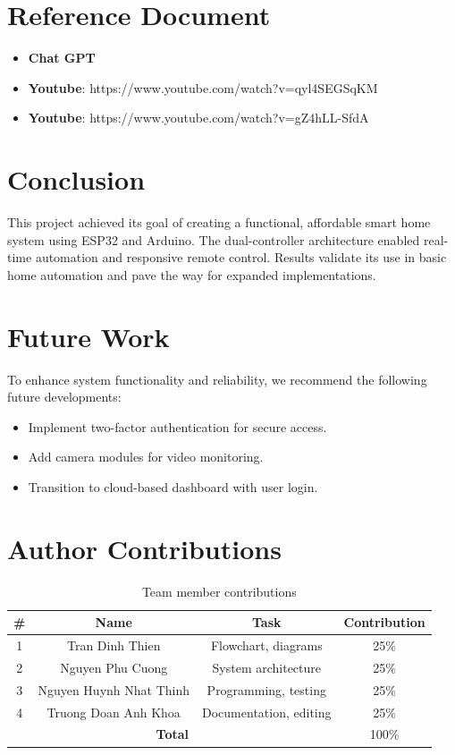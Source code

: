 \documentclass[conference, onecolumn]{IEEEtran}
\begin{document}
\section{Reference Document}
\begin{itemize}
    \item \textbf{Chat GPT}
    \item \textbf{Youtube}: https://www.youtube.com/watch?v=qyl4SEGSqKM
    \item \textbf{Youtube}: https://www.youtube.com/watch?v=gZ4hLL-SfdA
    
\end{itemize}

\section{Conclusion}
This project achieved its goal of creating a functional, affordable smart home system using ESP32 and Arduino. The dual-controller architecture enabled real-time automation and responsive remote control. Results validate its use in basic home automation and pave the way for expanded implementations.

\section{Future Work}
To enhance system functionality and reliability, we recommend the following future developments:
\begin{itemize}
    \item Implement two-factor authentication for secure access.
    \item Add camera modules for video monitoring.
    \item Transition to cloud-based dashboard with user login.

\end{itemize}

\section{Author Contributions}
\begin{table}[H]
\centering
\caption{Team member contributions}
\begin{tabular}{|c|c|c|c|}
\hline
\# & Name & Task & Contribution \\
\hline
1 & Tran Dinh Thien & Flowchart, diagrams & 25\% \\
2 & Nguyen Phu Cuong & System architecture & 25\% \\
3 & Nguyen Huynh Nhat Thinh & Programming, testing & 25\% \\
4 & Truong Doan Anh Khoa & Documentation, editing & 25\% \\
\hline
\multicolumn{3}{|c|}{\textbf{Total}} & 100\% \\
\hline
\end{tabular}
\end{table}
\end{document}
